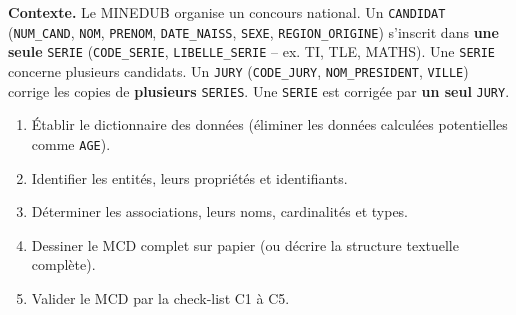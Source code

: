 \documentclass[11pt]{article}
\begin{document}
\begin{exercice}
\textbf{Contexte.} Le MINEDUB organise un concours national. Un \texttt{CANDIDAT} (\texttt{NUM\_CAND}, \texttt{NOM}, \texttt{PRENOM}, \texttt{DATE\_NAISS}, \texttt{SEXE}, \texttt{REGION\_ORIGINE}) s'inscrit dans \textbf{une seule} \texttt{SERIE} (\texttt{CODE\_SERIE}, \texttt{LIBELLE\_SERIE} -- ex. TI, TLE, MATHS). Une \texttt{SERIE} concerne plusieurs candidats. Un \texttt{JURY} (\texttt{CODE\_JURY}, \texttt{NOM\_PRESIDENT}, \texttt{VILLE}) corrige les copies de \textbf{plusieurs} \texttt{SERIES}. Une \texttt{SERIE} est corrigée par \textbf{un seul} \texttt{JURY}.
\begin{enumerate}
  \item Établir le dictionnaire des données (éliminer les données calculées potentielles comme \texttt{AGE}).
  \item Identifier les entités, leurs propriétés et identifiants.
  \item Déterminer les associations, leurs noms, cardinalités et types.
  \item Dessiner le MCD complet sur papier (ou décrire la structure textuelle complète).
  \item Valider le MCD par la check-list C1 à C5.
\end{enumerate}
\end{exercice}
\end{document}
